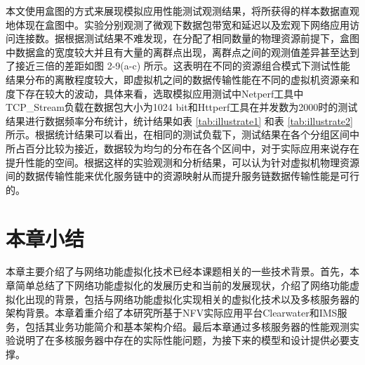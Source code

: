 本文使用盒图的方式来展现模拟应用性能测试观测结果，将所获得的样本数据直观地体现在盒图中。实验分别观测了微观下数据包带宽和延迟以及宏观下网络应用访问连接数。据根据测试结果不难发现，在分配了相同数量的物理资源前提下，盒图中数据盒的宽度较大并且有大量的离群点出现，离群点之间的观测值差异甚至达到了接近三倍的差距如图 2-9(a-c) 所示。这表明在不同的资源组合模式下测试性能结果分布的离散程度较大，即虚拟机之间的数据传输性能在不同的虚拟机资源亲和度下存在较大的波动，具体来看，选取模拟应用测试中Netperf工具中TCP\_Stream负载在数据包大小为1024 bit和Httperf工具在并发数为2000时的测试结果进行数据频率分布统计，统计结果如表 \ref{tab:illustrate1} 和表 \ref{tab:illustrate2} 所示。根据统计结果可以看出，在相同的测试负载下，测试结果在各个分组区间中所占百分比较为接近，数据较为均匀的分布在各个区间中，对于实际应用来说存在提升性能的空间。根据这样的实验观测和分析结果，可以认为针对虚拟机物理资源间的数据传输性能来优化服务链中的资源映射从而提升服务链数据传输性能是可行的。

\section{本章小结}
本章主要介绍了与网络功能虚拟化技术已经本课题相关的一些技术背景。首先，本章简单总结了下网络功能虚拟化的发展历史和当前的发展现状，介绍了网络功能虚拟化出现的背景，包括与网络功能虚拟化实现相关的虚拟化技术以及多核服务器的架构背景。本章着重介绍了本研究所基于NFV实际应用平台Clearwater和IMS服务，包括其业务功能简介和基本架构介绍。最后本章通过多核服务器的性能观测实验说明了在多核服务器中存在的实际性能问题，为接下来的模型和设计提供必要支撑。